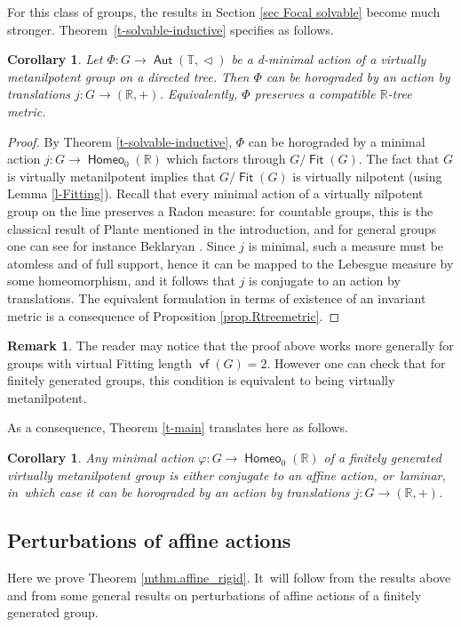 \documentclass[JEP,XML,SOM,Unicode,NoFloatCountersInSection,published]{cedram}
\newtheorem{cor}[thm]{Corollary}
\theoremstyle{definition}
\newtheorem{rem}[thm]{Remark}
\DeclareMathOperator{\Aut}{\mathsf{Aut}}
\DeclareMathOperator{\Fit}{\mathsf{Fit}}
\DeclareMathOperator{\homeo}{\mathsf{Homeo}}
\DeclareMathOperator{\vf}{\mathsf{vf}}
\newcommand{\R}{\mathbb{R}}
\newcommand{\Tbb}{\mathbb T}
\newcommand{\treeorder}{\mathrel{\triangleleft}}
\begin{document}
For this class of groups, the results in Section \ref{sec Focal solvable} become much stronger. Theorem~\ref{t-solvable-inductive} specifies as follows.
\begin{cor}\label{c-metanilpotent-tree}
Let $\Phi \colon G\to \Aut(\Tbb, \treeorder)$ be a d-minimal action of a virtually metanilpotent group on a directed tree. Then $\Phi$ can be horograded by an action by translations $j\colon G\to (\R, +)$. Equivalently, $\Phi $ preserves a compatible $\R$-tree metric.
\end{cor}
\begin{proof}
By Theorem \ref{t-solvable-inductive}, $\Phi $ can be horograded by a minimal action $j\colon G\to \homeo_0(\R)$ which factors through $G/\Fit(G)$. The fact that $G$ is virtually metanilpotent implies that $G/\Fit(G)$ is virtually nilpotent (using Lemma \ref{l-Fitting}).
Recall that every minimal action of a virtually nilpotent group on the line preserves a Radon measure: for countable groups, this is the classical result of Plante \cite{PlanteMeasure} mentioned in the introduction, and for general groups one can see for instance Beklaryan \cite[Th.\,B]{Beklaryan}. Since $j$ is minimal, such a measure must be atomless and of full support, hence it can be mapped to the Lebesgue measure by some homeomorphism, and it follows that $j$ is conjugate to an action by translations. The equivalent formulation in terms of existence of an invariant metric is a consequence of Proposition \ref{prop.Rtreemetric}. \qedhere
\end{proof}
\begin{rem} The reader may notice that the proof above works more generally for groups with virtual Fitting length $\vf(G)=2$. However one can check that for finitely generated groups, this condition is equivalent to being virtually metanilpotent.
\end{rem}

As a consequence, Theorem \ref{t-main} translates here as follows.

\begin{cor}\label{c-metanilpotent-dichothomy}
Any minimal action $\varphi\colon G\to \homeo_0(\R)$ of a finitely generated virtually metanilpotent group is either conjugate to an affine action, or~laminar, in~which case it can be horograded by an action by translations $j\colon G\to (\R, +)$.
\end{cor}

\subsection{Perturbations of affine actions}
Here we prove Theorem \ref{mthm.affine_rigid}. It~will follow from the results above and from some general results on perturbations of affine actions of a finitely generated group.
\end{document}
